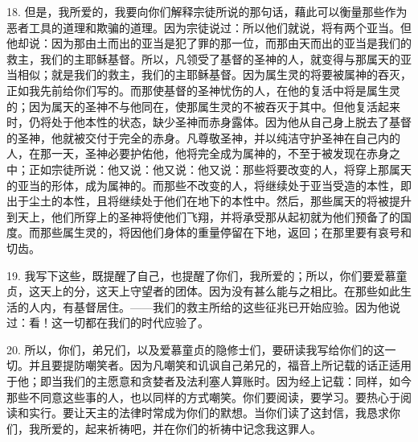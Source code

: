 18. 但是，我所爱的，我要向你们解释宗徒所说的那句话，藉此可以衡量那些作为恶者工具的道理和欺骗的道理。因为宗徒说过：所以他们就说，将有两个亚当。但他却说：因为那由土而出的亚当是犯了罪的那一位，而那由天而出的亚当是我们的救主，我们的主耶稣基督。所以，凡领受了基督的圣神的人，就变得与那属天的亚当相似；就是我们的救主，我们的主耶稣基督。因为属生灵的将要被属神的吞灭，正如我先前给你们写的。而那使基督的圣神忧伤的人，在他的复活中将是属生灵的；因为属天的圣神不与他同在，使那属生灵的不被吞灭于其中。但他复活起来时，仍将处于他本性的状态，缺少圣神而赤身露体。因为他从自己身上脱去了基督的圣神，他就被交付于完全的赤身。凡尊敬圣神，并以纯洁守护圣神在自己内的人，在那一天，圣神必要护佑他，他将完全成为属神的，不至于被发现在赤身之中；正如宗徒所说：他又说：他又说：他又说：那些将要改变的人，将穿上那属天的亚当的形体，成为属神的。而那些不改变的人，将继续处于亚当受造的本性，即出于尘土的本性，且将继续处于他们在地下的本性中。然后，那些属天的将被提升到天上，他们所穿上的圣神将使他们飞翔，并将承受那从起初就为他们预备了的国度。而那些属生灵的，将因他们身体的重量停留在下地，返回；在那里要有哀号和切齿。\par

19. 我写下这些，既提醒了自己，也提醒了你们，我所爱的；所以，你们要爱慕童贞，这天上的分，这天上守望者的团体。因为没有甚么能与之相比。在那些如此生活的人内，有基督居住。——我们的救主所给的这些征兆已开始应验。因为他说过：看！这一切都在我们的时代应验了。\par

20. 所以，你们，弟兄们，以及爱慕童贞的隐修士们，要研读我写给你们的这一切。并且要提防嘲笑者。因为凡嘲笑和讥讽自己弟兄的，福音上所记载的话正适用于他；即当我们的主愿意和贪婪者及法利塞人算账时。因为经上记载：同样，如今那些不同意这些事的人，也以同样的方式嘲笑。你们要阅读，要学习。要热心于阅读和实行。要让天主的法律时常成为你们的默想。当你们读了这封信，我恳求你们，我所爱的，起来祈祷吧，并在你们的祈祷中记念我这罪人。\par


